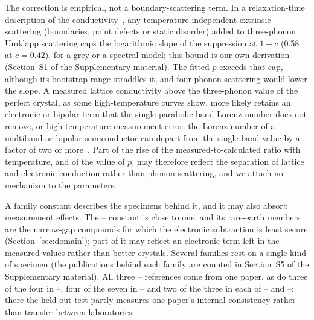 The correction is empirical, not a boundary-scattering term. In a relaxation-time description of
the conductivity~\cite{callaway1959model}, any temperature-independent extrinsic scattering
(boundaries, point defects or static disorder) added to three-phonon Umklapp scattering caps the
logarithmic slope of the suppression at $1-c$ (\num{0.58} at $c=\num{0.42}$), for a grey or a
spectral model; this bound is our own derivation (Section~S1 of the Supplementary material). The
fitted $p$ exceeds that cap, although its bootstrap range straddles it, and four-phonon scattering
would lower the slope. A measured lattice conductivity above the three-phonon value of the perfect
crystal, as some high-temperature curves show, more likely retains an electronic or bipolar term
that the single-parabolic-band Lorenz number does not remove, or high-temperature measurement
error: the Lorenz number of a multiband or bipolar semiconductor can depart from the single-band
value by a factor of two or more~\cite{thesberg2017on}. Part of the rise of the
measured-to-calculated ratio with temperature, and of the value of $p$, may therefore reflect the
separation of lattice and electronic conduction rather than phonon scattering, and we attach no
mechanism to the parameters.

A family constant describes the specimens behind it, and it may also absorb measurement effects.
The -- constant is close to one, and its rare-earth members are the narrow-gap
compounds for which the electronic subtraction is least secure (Section~\ref{sec:domain}); part of
it may reflect an electronic term left in the measured values rather than better crystals. Several
families rest on a single kind of specimen (the publications behind each family are counted in
Section~S5 of the Supplementary material). All three -- references come from one
paper, as do three of the four in --, four of the seven in -- and two
of the three in each of -- and --; there the held-out test partly
measures one paper's internal consistency rather than transfer between laboratories.

